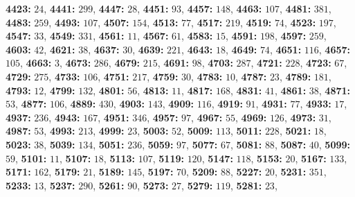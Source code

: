 \textsf{\bfseries 4423:} $24$, \textsf{\bfseries 4441:} $299$, \textsf{\bfseries 4447:} $28$, \textsf{\bfseries 4451:} $93$, \textsf{\bfseries 4457:} $148$, \textsf{\bfseries 4463:} $107$, \textsf{\bfseries 4481:} $381$, \textsf{\bfseries 4483:} $259$, \textsf{\bfseries 4493:} $107$, \textsf{\bfseries 4507:} $154$, \textsf{\bfseries 4513:} $77$, \textsf{\bfseries 4517:} $219$, \textsf{\bfseries 4519:} $74$, \textsf{\bfseries 4523:} $197$, \textsf{\bfseries 4547:} $33$, \textsf{\bfseries 4549:} $331$, \textsf{\bfseries 4561:} $11$, \textsf{\bfseries 4567:} $61$, \textsf{\bfseries 4583:} $15$, \textsf{\bfseries 4591:} $198$, \textsf{\bfseries 4597:} $259$, \textsf{\bfseries 4603:} $42$, \textsf{\bfseries 4621:} $38$, \textsf{\bfseries 4637:} $30$, \textsf{\bfseries 4639:} $221$, \textsf{\bfseries 4643:} $18$, \textsf{\bfseries 4649:} $74$, \textsf{\bfseries 4651:} $116$, \textsf{\bfseries 4657:} $105$, \textsf{\bfseries 4663:} $3$, \textsf{\bfseries 4673:} $286$, \textsf{\bfseries 4679:} $215$, \textsf{\bfseries 4691:} $98$, \textsf{\bfseries 4703:} $287$, \textsf{\bfseries 4721:} $228$, \textsf{\bfseries 4723:} $67$, \textsf{\bfseries 4729:} $275$, \textsf{\bfseries 4733:} $106$, \textsf{\bfseries 4751:} $217$, \textsf{\bfseries 4759:} $30$, \textsf{\bfseries 4783:} $10$, \textsf{\bfseries 4787:} $23$, \textsf{\bfseries 4789:} $181$, \textsf{\bfseries 4793:} $12$, \textsf{\bfseries 4799:} $132$, \textsf{\bfseries 4801:} $56$, \textsf{\bfseries 4813:} $11$, \textsf{\bfseries 4817:} $168$, \textsf{\bfseries 4831:} $41$, \textsf{\bfseries 4861:} $38$, \textsf{\bfseries 4871:} $53$, \textsf{\bfseries 4877:} $106$, \textsf{\bfseries 4889:} $430$, \textsf{\bfseries 4903:} $143$, \textsf{\bfseries 4909:} $116$, \textsf{\bfseries 4919:} $91$, \textsf{\bfseries 4931:} $77$, \textsf{\bfseries 4933:} $17$, \textsf{\bfseries 4937:} $236$, \textsf{\bfseries 4943:} $167$, \textsf{\bfseries 4951:} $346$, \textsf{\bfseries 4957:} $97$, \textsf{\bfseries 4967:} $55$, \textsf{\bfseries 4969:} $126$, \textsf{\bfseries 4973:} $31$, \textsf{\bfseries 4987:} $53$, \textsf{\bfseries 4993:} $213$, \textsf{\bfseries 4999:} $23$, \textsf{\bfseries 5003:} $52$, \textsf{\bfseries 5009:} $113$, \textsf{\bfseries 5011:} $228$, \textsf{\bfseries 5021:} $18$, \textsf{\bfseries 5023:} $38$, \textsf{\bfseries 5039:} $134$, \textsf{\bfseries 5051:} $236$, \textsf{\bfseries 5059:} $97$, \textsf{\bfseries 5077:} $67$, \textsf{\bfseries 5081:} $88$, \textsf{\bfseries 5087:} $40$, \textsf{\bfseries 5099:} $59$, \textsf{\bfseries 5101:} $11$, \textsf{\bfseries 5107:} $18$, \textsf{\bfseries 5113:} $107$, \textsf{\bfseries 5119:} $120$, \textsf{\bfseries 5147:} $118$, \textsf{\bfseries 5153:} $20$, \textsf{\bfseries 5167:} $133$, \textsf{\bfseries 5171:} $162$, \textsf{\bfseries 5179:} $21$, \textsf{\bfseries 5189:} $145$, \textsf{\bfseries 5197:} $70$, \textsf{\bfseries 5209:} $88$, \textsf{\bfseries 5227:} $20$, \textsf{\bfseries 5231:} $351$, \textsf{\bfseries 5233:} $13$, \textsf{\bfseries 5237:} $290$, \textsf{\bfseries 5261:} $90$, \textsf{\bfseries 5273:} $27$, \textsf{\bfseries 5279:} $119$, \textsf{\bfseries 5281:} $23$, 
